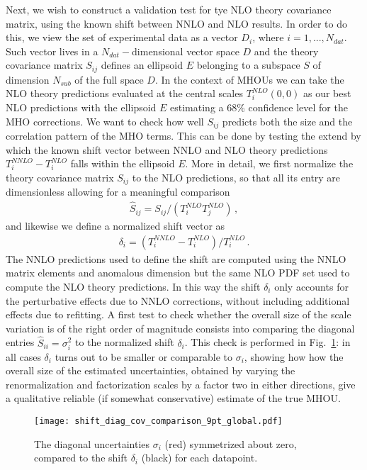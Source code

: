     
    Next, we wish to construct a validation test for tye NLO theory covariance matrix, using the known shift between
    NNLO and NLO results.
    In order to do this, we view the set of experimental data as a vector $D_i$, where $i = 1, ..., N_{dat}$.
    Such vector lives in a $N_{dat}-$dimensional vector space $D$ and
    the theory covariance matrix $S_{ij}$ defines an ellipsoid $E$ belonging to a subspace $S$ of dimension
    $N_{sub}$ of the full space $D$. 
    In the context of MHOUs we can take the NLO theory predictions evaluated at the central scales $T_i^{NLO}\left(0,0\right)$
    as our best NLO predictions with the ellipsoid $E$ estimating a $68\%$ confidence level for the MHO corrections. 
    We want to check how well $S_{ij}$ predicts both the size and the correlation pattern
    of the MHO terms. This can be done by testing the extend by which the known shift vector between NNLO and NLO theory predictions
    $T_i^{NNLO} - T_i^{NLO}$
    falls within the ellipsoid $E$.
    More in detail, we first normalize the theory covariance matrix $S_{ij}$ to the NLO predictions, so that all its
    entry are dimensionless allowing for a meaningful comparison 
    \begin{align}
        \hat{S}_{ij} = S_{ij}/\left(T_i^{NLO}T_j^{NLO}\right)\,,
    \end{align}
    and likewise we define a normalized shift vector as
    \begin{align}
        \delta_i = \left(T_i^{NNLO}-T_i^{NLO}\right)/T_i^{NLO}\,.
    \end{align}
    The NNLO predictions used to define the shift are computed using the NNLO matrix elements and anomalous dimension
    but the same NLO PDF set used to compute the NLO theory predictions. In this way the shift $\delta_i$ 
    only accounts for the perturbative effects due to NNLO corrections, without including additional effects
    due to refitting.
    A first test to check whether the overall size of the scale variation is of the right order of magnitude
    consists into comparing the diagonal entries $\hat{S}_{ii} = \sigma_i^2$ to the normalized shift $\delta_i$.
    This check is performed in Fig.~\ref{fig:diag_shift_validation_symmetric}: in all cases 
    $\delta_i$ turns out to be smaller or comparable to $\sigma_i$, showing how how
    the overall size of the estimated uncertainties, obtained by varying the renormalization and factorization scales by
    a factor two in either directions, give a qualitative reliable (if somewhat conservative) estimate of the true MHOU. 
    \begin{figure}[t!]
        \begin{center}
          \texttt{[image: shift\_diag\_cov\_comparison\_9pt\_global.pdf]}
          \caption{\small The diagonal uncertainties  $\sigma_i$ (red)
            symmetrized about zero,
            compared to the shift $\delta_i$ (black) for each
            datapoint.}
          \label{fig:diag_shift_validation_symmetric}
        \end{center}
    \end{figure}

